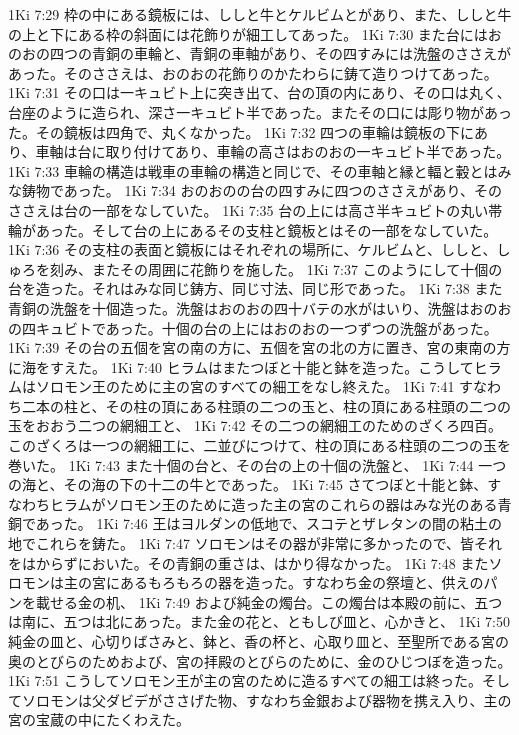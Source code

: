 1Ki 7:29  枠の中にある鏡板には、ししと牛とケルビムとがあり、また、ししと牛の上と下にある枠の斜面には花飾りが細工してあった。
1Ki 7:30  また台にはおのおの四つの青銅の車輪と、青銅の車軸があり、その四すみには洗盤のささえがあった。そのささえは、おのおの花飾りのかたわらに鋳て造りつけてあった。
1Ki 7:31  その口は一キュビト上に突き出て、台の頂の内にあり、その口は丸く、台座のように造られ、深さ一キュビト半であった。またその口には彫り物があった。その鏡板は四角で、丸くなかった。
1Ki 7:32  四つの車輪は鏡板の下にあり、車軸は台に取り付けてあり、車輪の高さはおのおの一キュビト半であった。
1Ki 7:33  車輪の構造は戦車の車輪の構造と同じで、その車軸と縁と輻と轂とはみな鋳物であった。
1Ki 7:34  おのおのの台の四すみに四つのささえがあり、そのささえは台の一部をなしていた。
1Ki 7:35  台の上には高さ半キュビトの丸い帯輪があった。そして台の上にあるその支柱と鏡板とはその一部をなしていた。
1Ki 7:36  その支柱の表面と鏡板にはそれぞれの場所に、ケルビムと、ししと、しゅろを刻み、またその周囲に花飾りを施した。
1Ki 7:37  このようにして十個の台を造った。それはみな同じ鋳方、同じ寸法、同じ形であった。
1Ki 7:38  また青銅の洗盤を十個造った。洗盤はおのおの四十バテの水がはいり、洗盤はおのおの四キュビトであった。十個の台の上にはおのおの一つずつの洗盤があった。
1Ki 7:39  その台の五個を宮の南の方に、五個を宮の北の方に置き、宮の東南の方に海をすえた。
1Ki 7:40  ヒラムはまたつぼと十能と鉢を造った。こうしてヒラムはソロモン王のために主の宮のすべての細工をなし終えた。
1Ki 7:41  すなわち二本の柱と、その柱の頂にある柱頭の二つの玉と、柱の頂にある柱頭の二つの玉をおおう二つの網細工と、
1Ki 7:42  その二つの網細工のためのざくろ四百。このざくろは一つの網細工に、二並びにつけて、柱の頂にある柱頭の二つの玉を巻いた。
1Ki 7:43  また十個の台と、その台の上の十個の洗盤と、
1Ki 7:44  一つの海と、その海の下の十二の牛とであった。
1Ki 7:45  さてつぼと十能と鉢、すなわちヒラムがソロモン王のために造った主の宮のこれらの器はみな光のある青銅であった。
1Ki 7:46  王はヨルダンの低地で、スコテとザレタンの間の粘土の地でこれらを鋳た。
1Ki 7:47  ソロモンはその器が非常に多かったので、皆それをはからずにおいた。その青銅の重さは、はかり得なかった。
1Ki 7:48  またソロモンは主の宮にあるもろもろの器を造った。すなわち金の祭壇と、供えのパンを載せる金の机、
1Ki 7:49  および純金の燭台。この燭台は本殿の前に、五つは南に、五つは北にあった。また金の花と、ともしび皿と、心かきと、
1Ki 7:50  純金の皿と、心切りばさみと、鉢と、香の杯と、心取り皿と、至聖所である宮の奥のとびらのためおよび、宮の拝殿のとびらのために、金のひじつぼを造った。
1Ki 7:51  こうしてソロモン王が主の宮のために造るすべての細工は終った。そしてソロモンは父ダビデがささげた物、すなわち金銀および器物を携え入り、主の宮の宝蔵の中にたくわえた。
